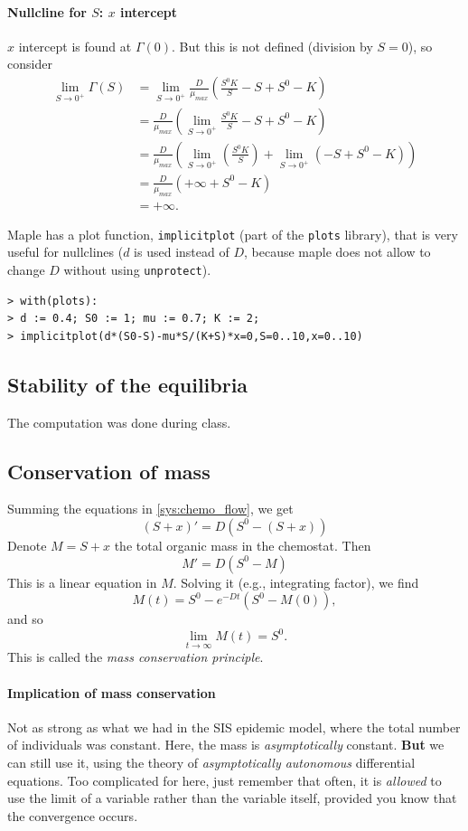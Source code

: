 \paragraph{Nullcline for $S$: $x$ intercept}
$x$ intercept is found at $\Gamma(0)$. But this is not defined (division by $S=0$), so consider
\begin{align*}
\lim_{S\to 0^+}\Gamma(S) &= \lim_{S\to 0^+}\frac{D}{\mu_{max}}\left(\frac{S^0K}S-S+S^0-K\right) \\
&= \frac{D}{\mu_{max}}\left(\lim_{S\to 0^+}\frac{S^0K}S-S+S^0-K\right) \\
&= \frac{D}{\mu_{max}}\left(\lim_{S\to 0^+}\left(\frac{S^0K}S\right)+\lim_{S\to 0^+}\left(-S+S^0-K\right)\right) \\
&= \frac{D}{\mu_{max}}\left(+\infty+S^0-K\right) \\
&= +\infty.
\end{align*}


Maple has a plot function, {\tt implicitplot} (part of the {\tt plots} library), that is very useful for nullclines ($d$ is used instead of $D$, because maple does not allow to change $D$ without using {\tt unprotect}).
\begin{verbatim}
> with(plots):
> d := 0.4; S0 := 1; mu := 0.7; K := 2;
> implicitplot(d*(S0-S)-mu*S/(K+S)*x=0,S=0..10,x=0..10)
\end{verbatim}



\subsection{Stability of the equilibria}
The computation was done during class.


\subsection{Conservation of mass}
Summing the equations in \eqref{sys:chemo_flow}, we get
\[
(S+x)'=D\left(S^0-(S+x)\right)
\]
Denote $M=S+x$ the total organic mass in the chemostat. Then
\[
M'=D(S^0-M)
\]
This is a linear equation in $M$. Solving it (e.g., integrating factor), we find
\[
M(t)=S^0-e^{-Dt}\left(S^0-M(0)\right),
\]
and so
\[
\lim_{t\to\infty}M(t)=S^0.
\]
This is called the \emph{mass conservation principle}.

\paragraph{Implication of mass conservation}
Not as strong as what we had in the SIS epidemic model, where the total number of individuals was constant. Here, the mass is \emph{asymptotically} constant.
{\bf But} we can still use it, using the theory of \emph{asymptotically autonomous} differential equations. Too complicated for here, just remember that often, it is \emph{allowed} to use the limit of a variable rather than the variable itself, provided you know that the convergence occurs.

